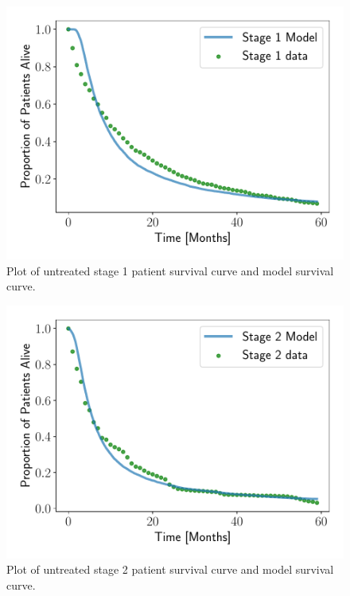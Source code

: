 \documentclass[letterpaper
, superscriptaddress
, twocolumn
, aps
]{revtex4}
\begin{document}
\begin{figure}
	\includegraphics[width=1.00\columnwidth]{Figures/stage1.pdf}
	\caption{Plot of untreated stage 1 patient survival curve and model survival curve.}
	\label{s1}
\end{figure}
\begin{figure}
	\includegraphics[width=1.00\columnwidth]{Figures/stage2.pdf}
	\caption{Plot of untreated stage 2 patient survival curve and model survival curve.}
	\label{s2}
\end{figure}
\end{document}
